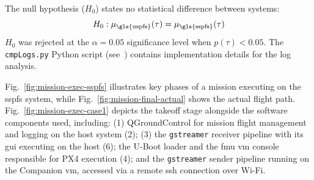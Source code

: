 The null hypothesis ($H_0$) states no statistical difference between systems:
\begin{equation}
H_0: \mu_{\text{\gls{uspfs}}}(\tau) = \mu_{\text{\gls{sspfs}}}(\tau)
\end{equation}
$H_0$ was rejected at the $\alpha = 0.05$ significance level when $p(\tau) <
0.05$. The \lstinline{cmpLogs.py} Python script (see~\cite{thesis-sw-github})
contains implementation details for the log analysis.

Fig.~\ref{fig:mission-exec-sspfs} illustrates key phases of a mission
executing on the \gls{sspfs} system, while
Fig.~\ref{fig:mission-final-actual} shows the actual flight path.
Fig.~\ref{fig:mission-exec-case1} depicts the takeoff stage alongside the
software components used, including: (1) QGroundControl for mission flight
management and logging on the host system (2); (3) the \lstinline{gstreamer}
receiver pipeline with its \gls{gui} executing on the host (6); the
U-Boot loader and the \gls{fmu} \gls{vm} console responsible for PX4 execution
(4); and the \lstinline{gstreamer} sender pipeline running on the Companion
\gls{vm}, accessed via a remote \gls{ssh} connection over Wi-Fi.

